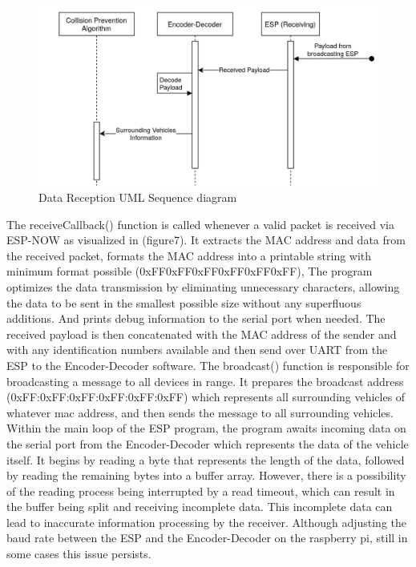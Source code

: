 \documentclass[
12pt,
oneside, 
onehalfspacing, 
nolistspacing, 
parskip, 
chapterinoneline, 
]{AASTCOMPUTER}
\begin{document}
\begin{figure}[!ht]
\centering
\includegraphics[scale=0.5]{Figures/9.png}
\caption[Data Reception UML Sequence diagram]{Data Reception UML Sequence diagram}
\label{fig:TCU}
\end{figure}
The receiveCallback() function is called whenever a valid packet is received via ESP-NOW as visualized in  (figure7). It extracts the MAC address and data from the received packet, formats the MAC address into a printable string with minimum format possible (0xFF0xFF0xFF0xFF0xFF0xFF), The program optimizes the data transmission by eliminating unnecessary characters, allowing the data to be sent in the smallest possible size without any superfluous additions. And prints debug information to the serial port when needed. The received payload is then concatenated with the MAC address of the sender and with any identification numbers available and then send over UART from the ESP to the Encoder-Decoder software. 
The broadcast() function is responsible for broadcasting a message to all devices in range. It prepares the broadcast address (0xFF:0xFF:0xFF:0xFF:0xFF:0xFF) which represents all surrounding vehicles of whatever mac address, and then sends the message to all surrounding vehicles.
Within the main loop of the ESP program, the program awaits incoming data on the serial port from the Encoder-Decoder which represents the data of the vehicle itself. It begins by reading a byte that represents the length of the data, followed by reading the remaining bytes into a buffer array. However, there is a possibility of the reading process being interrupted by a read timeout, which can result in the buffer being split and receiving incomplete data. This incomplete data can lead to inaccurate information processing by the receiver. Although adjusting the baud rate between the ESP and the Encoder-Decoder on the raspberry pi, still in some cases this issue persists.
\end{document}
